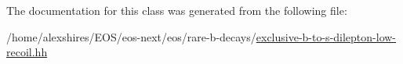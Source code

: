 \label{classeos_1_1BToKDilepton_3_01LowRecoil_01_4_a2fd7d6d0e830e35f45f8d434a4b10059}


The documentation for this class was generated from the following file:\begin{DoxyCompactItemize}
\item 
/home/alexshires/EOS/eos-\/next/eos/rare-\/b-\/decays/\hyperlink{exclusive-b-to-s-dilepton-low-recoil_8hh}{exclusive-\/b-\/to-\/s-\/dilepton-\/low-\/recoil.hh}\end{DoxyCompactItemize}

